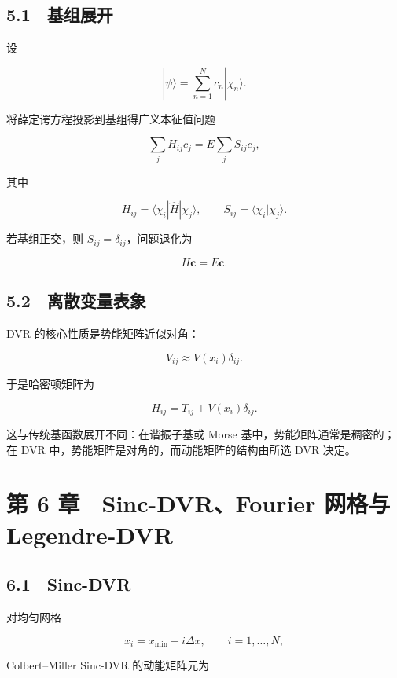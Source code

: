 \documentclass[
  a4paper,
]{ctexbook}
\begin{document}
\hypertarget{ux57faux7ec4ux5c55ux5f00}{%
\subsection{5.1　基组展开}\label{ux57faux7ec4ux5c55ux5f00}}

设

\[
|\psi\rangle=\sum_{n=1}^{N}c_n|\chi_n\rangle.
\]

将薛定谔方程投影到基组得广义本征值问题

\[
\sum_j H_{ij}c_j
=
E\sum_j S_{ij}c_j,
\]

其中

\[
H_{ij}=\langle\chi_i|\hat H|\chi_j\rangle,
\qquad
S_{ij}=\langle\chi_i|\chi_j\rangle.
\]

若基组正交，则 \(S_{ij}=\delta_{ij}\)，问题退化为

\[
H\mathbf c=E\mathbf c.
\]

\hypertarget{ux79bbux6563ux53d8ux91cfux8868ux8c61}{%
\subsection{5.2　离散变量表象}\label{ux79bbux6563ux53d8ux91cfux8868ux8c61}}

DVR 的核心性质是势能矩阵近似对角：

\[
V_{ij}
\approx
V(x_i)\delta_{ij}.
\]

于是哈密顿矩阵为

\[
H_{ij}
=
T_{ij}
+
V(x_i)\delta_{ij}.
\]

这与传统基函数展开不同：在谐振子基或 Morse
基中，势能矩阵通常是稠密的；在 DVR
中，势能矩阵是对角的，而动能矩阵的结构由所选 DVR 决定。

\hypertarget{ux7b2c-6-ux7ae0-sinc-dvrfourier-ux7f51ux683cux4e0e-legendre-dvr}{%
\section{第 6 章　Sinc-DVR、Fourier 网格与
Legendre-DVR}\label{ux7b2c-6-ux7ae0-sinc-dvrfourier-ux7f51ux683cux4e0e-legendre-dvr}}

\hypertarget{sinc-dvr}{%
\subsection{6.1　Sinc-DVR}\label{sinc-dvr}}

对均匀网格

\[
x_i=x_{\min}+i\Delta x,
\qquad
i=1,\ldots,N,
\]

Colbert--Miller Sinc-DVR 的动能矩阵元为
\end{document}

